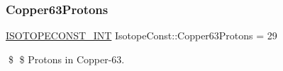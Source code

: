 \subsubsection{\texorpdfstring{Copper63\+Protons}{Copper63Protons}}
{\footnotesize\ttfamily \mbox{\hyperlink{group___isotope_const-_macros_ga5f18360b3e99483a35c32d789e62621c}{I\+S\+O\+T\+O\+P\+E\+C\+O\+N\+S\+T\+\_\+\+I\+NT}} Isotope\+Const\+::\+Copper63\+Protons = 29}

\$ \$ Protons in Copper-\/63. 